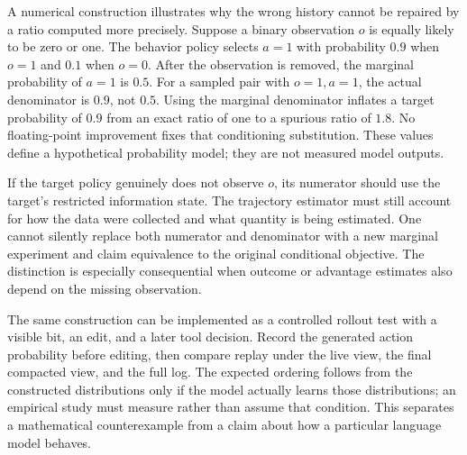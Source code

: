 A numerical construction illustrates why the wrong history cannot be repaired by a ratio computed more precisely. Suppose a binary observation $o$ is equally likely to be zero or one. The behavior policy selects $a=1$ with probability $0.9$ when $o=1$ and $0.1$ when $o=0$. After the observation is removed, the marginal probability of $a=1$ is $0.5$. For a sampled pair with $o=1,a=1$, the actual denominator is $0.9$, not $0.5$. Using the marginal denominator inflates a target probability of $0.9$ from an exact ratio of one to a spurious ratio of $1.8$. No floating-point improvement fixes that conditioning substitution. These values define a hypothetical probability model; they are not measured model outputs.

If the target policy genuinely does not observe $o$, its numerator should use the target's restricted information state. The trajectory estimator must still account for how the data were collected and what quantity is being estimated. One cannot silently replace both numerator and denominator with a new marginal experiment and claim equivalence to the original conditional objective. The distinction is especially consequential when outcome or advantage estimates also depend on the missing observation.

The same construction can be implemented as a controlled rollout test with a visible bit, an edit, and a later tool decision. Record the generated action probability before editing, then compare replay under the live view, the final compacted view, and the full log. The expected ordering follows from the constructed distributions only if the model actually learns those distributions; an empirical study must measure rather than assume that condition. This separates a mathematical counterexample from a claim about how a particular language model behaves.

